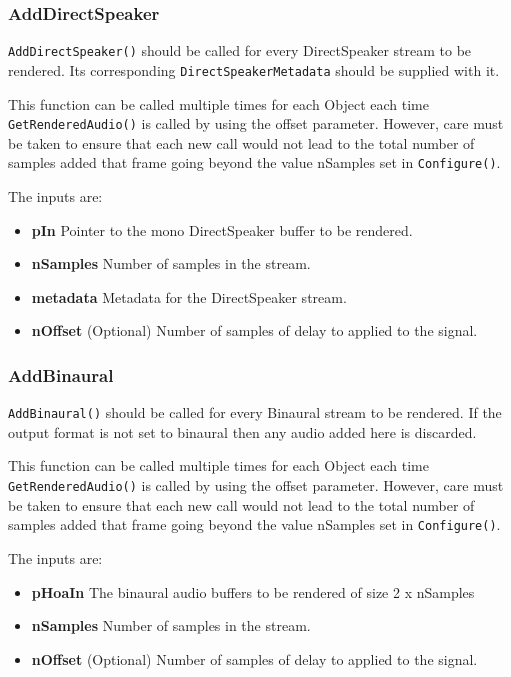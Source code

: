 \documentclass[12pt]{report}
\newcommand{\code}[1]{\texttt{#1}}
\begin{document}
\subsubsection{AddDirectSpeaker}

\code{AddDirectSpeaker()} should be called for every DirectSpeaker stream to be rendered. Its corresponding \code{DirectSpeakerMetadata} should be supplied with it.

This function can be called multiple times for each Object each time \code{GetRenderedAudio()} is called by using the offset parameter.
However, care must be taken to ensure that each new call would not lead to the total number of samples added that frame going beyond the value nSamples set in \code{Configure()}.

The inputs are:
\begin{itemize}
    \item \textbf{pIn} Pointer to the mono DirectSpeaker buffer to be rendered.
    \item \textbf{nSamples} Number of samples in the stream.
    \item \textbf{metadata} Metadata for the DirectSpeaker stream.
    \item \textbf{nOffset} (Optional) Number of samples of delay to applied to the signal.
\end{itemize}

\subsubsection{AddBinaural}

\code{AddBinaural()} should be called for every Binaural stream to be rendered. If the output format is not set to binaural then any audio added here is discarded.

This function can be called multiple times for each Object each time \code{GetRenderedAudio()} is called by using the offset parameter.
However, care must be taken to ensure that each new call would not lead to the total number of samples added that frame going beyond the value nSamples set in \code{Configure()}.

The inputs are:
\begin{itemize}
    \item \textbf{pHoaIn} The binaural audio buffers to be rendered of size 2 x nSamples
    \item \textbf{nSamples} Number of samples in the stream.
    \item \textbf{nOffset} (Optional) Number of samples of delay to applied to the signal.
\end{itemize}
\end{document}
